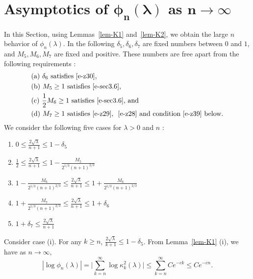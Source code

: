 \documentclass{amsart}
\theoremstyle{definition}
\theoremstyle{remark}
\numberwithin{equation}{section}
\begin{document}


\bigskip
\section{\bf{Asymptotics of $\mathbf{\phi_n(\lambda)}$ as $\mathbf{ n\to\infty}$ }}
\label{s-phi}

In this Section, using Lemmas~\ref{lem-K1} and~\ref{lem-K2}, 
we obtain the large $n$ behavior of $\phi_n(\lambda)$.
In the following $\delta_5,\delta_6,\delta_7$ are fixed numbers 
between $0$ and $1$, and 
$M_5,M_6,M_7$ are fixed and positive.
These numbers are free apart from the following requirements : 
\begin{align*}
   &\text{(a) $\delta_6$ satisfies~\eqref{e-z30},}\\
   &\text{(b) $M_5\geq 1$ satisfies~\eqref{e-sec3.6},}\\
   &\text{(c) $\frac12 M_6\geq 1$ satisfies~\eqref{e-sec3.6}, and}\\
   &\text{(d) $M_7\geq 1$ satisfies~\eqref{e-z29}, ~\eqref{e-z28} 
and condition~\eqref{e-z39} below.}
\end{align*}
We consider the following five cases for $\lambda>0$ and $n$ :
\begin{enumerate}
   \item $0\le \frac{2\sqrt{\lambda}}{n+1}\le 1-\delta_5$
   \item $\frac12 \le \frac{2\sqrt{\lambda}}{n+1} 
\le 1-\frac{M_5}{2^{1/3}{(n+1)}^{2/3}}$
   \item $1-\frac{M_6}{2^{1/3}{(n+1)}^{2/3}} \le \frac{2\sqrt{\lambda}}{n+1} 
\le 1+\frac{M_6}{2^{1/3}{(n+1)}^{2/3}}$
   \item $1+\frac{M_7}{2^{1/3}{(n+1)}^{2/3}} \le \frac{2\sqrt{\lambda}}{n+1}
\le 1+\delta_6$
   \item $1+\delta_7 \le \frac{2\sqrt{\lambda}}{n+1}$
\end{enumerate}

\bigskip
Consider case (i). 
For any $k\geq n$, $\frac{2\sqrt{\lambda}}{k+1}\le 1-\delta_5$. 
From Lemma~\ref{lem-K1} (i), we have as $n\to\infty$, 
\begin{equation}
   |\log{\phi_n(\lambda)}|
   =\bigl|\sum_{k=n}^{\infty} \log{\kappa^2_k}(\lambda)\bigr|
   \le \sum_{k=n}^{\infty} Ce^{-ck} \le Ce^{-cn}.
\end{equation}
\end{document}
